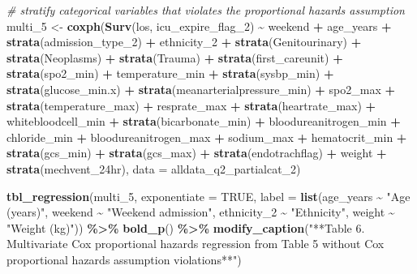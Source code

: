 \documentclass[
]{article}
\newenvironment{Shaded}{\begin{snugshade}}{\end{snugshade}}
\newcommand{\AttributeTok}[1]{\textcolor[rgb]{0.13,0.29,0.53}{#1}}
\newcommand{\CommentTok}[1]{\textcolor[rgb]{0.56,0.35,0.01}{\textit{#1}}}
\newcommand{\ConstantTok}[1]{\textcolor[rgb]{0.56,0.35,0.01}{#1}}
\newcommand{\FunctionTok}[1]{\textcolor[rgb]{0.13,0.29,0.53}{\textbf{#1}}}
\newcommand{\NormalTok}[1]{#1}
\newcommand{\OtherTok}[1]{\textcolor[rgb]{0.56,0.35,0.01}{#1}}
\newcommand{\SpecialCharTok}[1]{\textcolor[rgb]{0.81,0.36,0.00}{\textbf{#1}}}
\newcommand{\StringTok}[1]{\textcolor[rgb]{0.31,0.60,0.02}{#1}}
\begin{document}
\begin{Shaded}
\begin{Highlighting}[]
\CommentTok{\# stratify categorical variables that violates the proportional hazards assumption}
\NormalTok{multi\_5 }\OtherTok{\textless{}{-}} \FunctionTok{coxph}\NormalTok{(}\FunctionTok{Surv}\NormalTok{(los, icu\_expire\_flag\_2) }\SpecialCharTok{\textasciitilde{}}\NormalTok{ weekend }\SpecialCharTok{+}\NormalTok{ age\_years }\SpecialCharTok{+} \FunctionTok{strata}\NormalTok{(admission\_type\_2) }\SpecialCharTok{+}\NormalTok{ ethnicity\_2 }\SpecialCharTok{+} \FunctionTok{strata}\NormalTok{(Genitourinary) }\SpecialCharTok{+} \FunctionTok{strata}\NormalTok{(Neoplasms) }\SpecialCharTok{+} \FunctionTok{strata}\NormalTok{(Trauma) }\SpecialCharTok{+} \FunctionTok{strata}\NormalTok{(first\_careunit) }\SpecialCharTok{+} \FunctionTok{strata}\NormalTok{(spo2\_min) }\SpecialCharTok{+}\NormalTok{ temperature\_min }\SpecialCharTok{+} \FunctionTok{strata}\NormalTok{(sysbp\_min)  }\SpecialCharTok{+} \FunctionTok{strata}\NormalTok{(glucose\_min.x) }\SpecialCharTok{+} \FunctionTok{strata}\NormalTok{(meanarterialpressure\_min) }\SpecialCharTok{+}\NormalTok{ spo2\_max }\SpecialCharTok{+} \FunctionTok{strata}\NormalTok{(temperature\_max) }\SpecialCharTok{+}\NormalTok{ resprate\_max }\SpecialCharTok{+} \FunctionTok{strata}\NormalTok{(heartrate\_max) }\SpecialCharTok{+}\NormalTok{ whitebloodcell\_min }\SpecialCharTok{+} \FunctionTok{strata}\NormalTok{(bicarbonate\_min) }\SpecialCharTok{+}\NormalTok{ bloodureanitrogen\_min }\SpecialCharTok{+}\NormalTok{ chloride\_min }\SpecialCharTok{+}\NormalTok{ bloodureanitrogen\_max }\SpecialCharTok{+}\NormalTok{ sodium\_max }\SpecialCharTok{+}\NormalTok{ hematocrit\_min }\SpecialCharTok{+} \FunctionTok{strata}\NormalTok{(gcs\_min) }\SpecialCharTok{+} \FunctionTok{strata}\NormalTok{(gcs\_max) }\SpecialCharTok{+} \FunctionTok{strata}\NormalTok{(endotrachflag) }\SpecialCharTok{+}\NormalTok{ weight }\SpecialCharTok{+} \FunctionTok{strata}\NormalTok{(mechvent\_24hr), }\AttributeTok{data =}\NormalTok{ alldata\_q2\_partialcat\_2)}

\FunctionTok{tbl\_regression}\NormalTok{(multi\_5, }
               \AttributeTok{exponentiate =} \ConstantTok{TRUE}\NormalTok{,}
               \AttributeTok{label =} \FunctionTok{list}\NormalTok{(age\_years }\SpecialCharTok{\textasciitilde{}} \StringTok{"Age (years)"}\NormalTok{,}
\NormalTok{                     weekend }\SpecialCharTok{\textasciitilde{}} \StringTok{"Weekend admission"}\NormalTok{,}
\NormalTok{                     ethnicity\_2 }\SpecialCharTok{\textasciitilde{}} \StringTok{"Ethnicity"}\NormalTok{,}
\NormalTok{                     weight }\SpecialCharTok{\textasciitilde{}} \StringTok{"Weight (kg)"}\NormalTok{)) }\SpecialCharTok{\%\textgreater{}\%}
  \FunctionTok{bold\_p}\NormalTok{() }\SpecialCharTok{\%\textgreater{}\%}
  \FunctionTok{modify\_caption}\NormalTok{(}\StringTok{"**Table 6. Multivariate Cox proportional hazards regression from Table 5 without Cox proportional hazards assumption violations**"}\NormalTok{)}
\end{Highlighting}
\end{Shaded}
\end{document}
